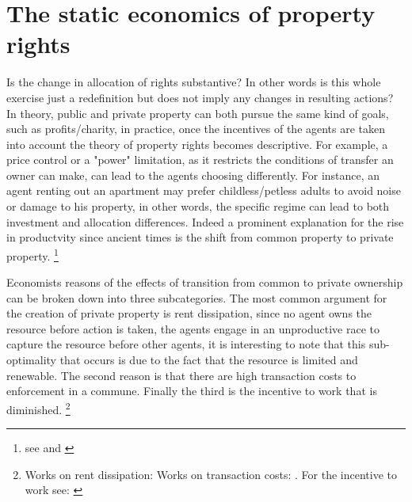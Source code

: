 \documentclass[12pt]{article}
\numberwithin{equation}{section}
\begin{document}
\section{The static economics of property rights}

Is the change in allocation of rights substantive? In other words is this whole exercise just a redefinition but does not imply any changes in resulting actions? In theory, public and private property can both pursue the same kind of goals, such as profits/charity, in practice, once the incentives of the agents are taken into account the theory of property rights becomes descriptive. For example, a price control or a "power" limitation, as it restricts the conditions of transfer an owner can make, can lead to the agents choosing differently. For instance, an agent renting out an apartment may prefer childless/petless adults to avoid noise or damage to his property, in other words, the specific regime can lead to both investment and allocation differences. Indeed a prominent explanation for the rise in productvity since ancient times is the shift from common property to private property. \footnote{see \cite{anderson1983privatizing} and \cite{north1973rise}}


Economists reasons of the effects of transition from common to private ownership can be broken down into three subcategories. The most common argument for the creation of private property is rent dissipation, since no agent owns the resource before action is taken, the agents engage in an unproductive race to capture the  resource before other agents, it is interesting to note that this sub-optimality that occurs is due to the fact that the resource is limited and renewable. The second reason is that there are high transaction costs to enforcement in a commune. Finally the third is the incentive to work that is diminished.  \footnote{ Works on rent dissipation:\cite{dasgupta1979economic} \cite{gordon1954economic} \cite{Cheung1970} \cite{schaefer1957some} \cite{scott1955fishery} \cite{clark1990optimal} Works on transaction costs: \cite{coase1960problem} \cite{demsetz1983structure}. For the incentive to work see: \cite{north1990} }
\end{document}
